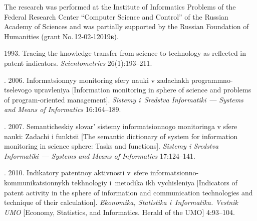 



\Ack
\noindent
The research was performed at the Institute of Informatics Problems of the
Federal Research
Center ``Computer Science and Control'' of the
Russian Academy of Sciences and was partially supported by the Russian Foundation of Humanities
(grant No.\,12-02-12019в).




  \begin{multicols}{2}

\renewcommand{\bibname}{\protect\rmfamily References}



{\small\frenchspacing
 {%
  \begin{thebibliography}{99}





 1993. Tracing the knowledge transfer from science to technology as
reflected in patent indicators. \textit{Scientometrics} 26(1):193--211.

. 2006. Informatsionnyy monitoring sfery nauki
v zadachakh programmno-tselevogo upravleniya [Information monitoring in sphere of
science and problems of program-oriented management]. \textit{Sistemy i~Sredstva
Informatiki}~--- \textit{Systems and Means of Informatics} 16:164--189.

. 2007. Seman\-ti\-che\-skiy slovar' sistemy
informatsionnogo monitoringa v sfere nauki: Zadachi i funktsii [The semantic dictionary of
system for information monitoring in science sphere: Tasks and functions].
\textit{Sistemy i Sredstva Informatiki}~---
\textit{Systems and Means of Informatics} 17:124--141.

. 2010. Indikatory patentnoy
aktivnosti v~sfere informatsionno-kommunikatsionnykh tekhnologiy i~metodika ikh
vychisleniya [Indicators of patent activity in the sphere of information and
communication technologies and technique of their calculation].
\textit{Ekonomika, Statistika i~Informatika.
Vestnik UMO} [Economy, Statistics, and Informatics. Herald of the UMO] 4:93--104.



\end{thebibliography}}}
\end{multicols}
